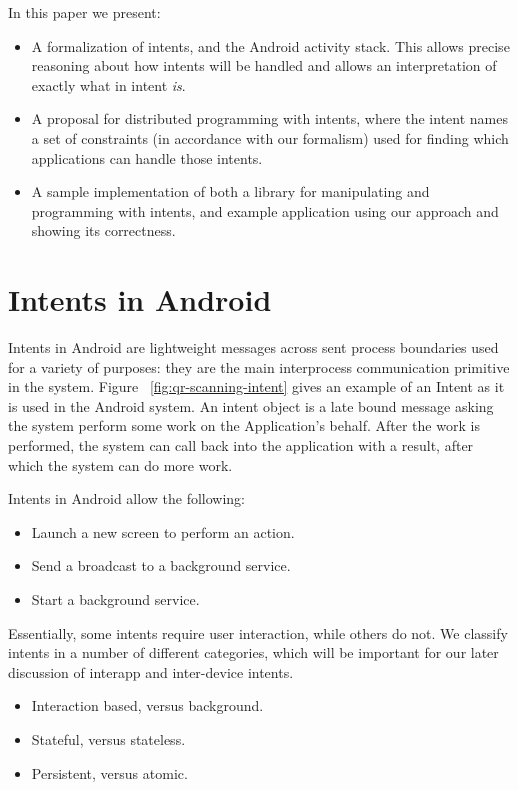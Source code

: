 \documentclass{acm_proc_article-sp}
\begin{document}
In this paper we present:

\begin{itemize}
\item A formalization of intents, and the Android activity stack.
  This allows precise reasoning about how intents will be handled and
  allows an interpretation of exactly what in intent \emph{is}.

\item A proposal for distributed programming with intents, where the
  intent names a set of constraints (in accordance with our formalism)
  used for finding which applications can handle those intents.

\item A sample implementation of both a library for manipulating and
  programming with intents, and example application using our approach
  and showing its correctness.

\end{itemize}

\section{Intents in Android}
\label{sec:intent-overview}

Intents in Android are lightweight messages across sent process
boundaries used for a variety of purposes: they are the main
interprocess communication primitive in the system. Figure
~\ref{fig:qr-scanning-intent} gives an example of an Intent as it is used
in the Android system.  An intent object is a late bound message
asking the system perform some work on the Application's behalf.
After the work is performed, the system can call back into the
application with a result, after which the system can do more work.

Intents in Android allow the following:

\begin{itemize}
\item Launch a new screen to perform an action.
\item Send a broadcast to a background service.
\item Start a background service.
\end{itemize}

Essentially, some intents require user interaction, while others do
not.  We classify intents in a number of different categories, which
will be important for our later discussion of interapp and
inter-device intents.

\begin{itemize}
\item Interaction based, versus background.
\item Stateful, versus stateless.
\item Persistent, versus atomic.
\end{itemize}
\end{document}
